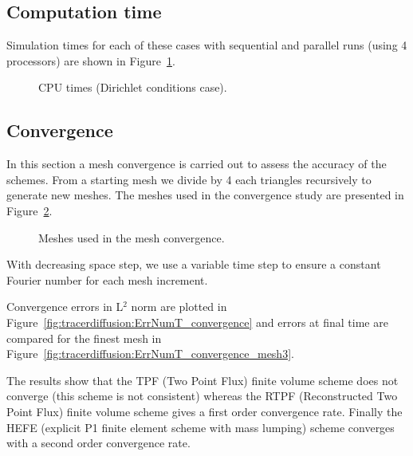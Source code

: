 \subsection{Computation time}

Simulation times for each of these cases with sequential and parallel runs
(using 4 processors) are shown in Figure~\ref{fig:tracerdiffusion:cputime}.

\begin{figure}[H]
  \centering
  \caption{CPU times (Dirichlet conditions case).}
  \label{fig:tracerdiffusion:cputime}
\end{figure}

\subsection{Convergence}

In this section a mesh convergence is carried out to assess the accuracy of the
schemes. 
From a starting mesh we divide by 4 each triangles recursively to generate new
meshes.
The meshes used in the convergence study are presented in
Figure~\ref{t2d:tracerdiffusion:meshes}.

\begin{figure}[h!]
 \centering
 \caption{Meshes used in the mesh convergence.}
 \label{t2d:tracerdiffusion:meshes}
\end{figure}

With decreasing space step, we use a variable time step to ensure a constant
Fourier number
for each mesh increment.

Convergence errors in L$^2$ norm are plotted in
Figure~\ref{fig:tracerdiffusion:ErrNumT_convergence} 
and errors at final time are compared for the finest mesh in
Figure~\ref{fig:tracerdiffusion:ErrNumT_convergence_mesh3}.

The results show that the TPF (Two Point Flux) finite volume scheme does not
converge 
(this scheme is not consistent)
whereas the RTPF (Reconstructed Two Point Flux) finite volume scheme gives a
first order convergence rate.
Finally the HEFE (explicit P1 finite element scheme with mass lumping)
scheme converges with a second order convergence rate.

